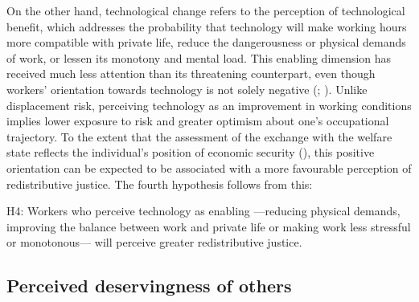 \documentclass[
  12pt,
]{article}
\begin{document}
On the other hand, technological change refers to the perception of
technological benefit, which addresses the probability that technology
will make working hours more compatible with private life, reduce the
dangerousness or physical demands of work, or lessen its monotony and
mental load. This enabling dimension has received much less attention
than its threatening counterpart, even though workers' orientation
towards technology is not solely negative
(;
). Unlike
displacement risk, perceiving technology as an improvement in working
conditions implies lower exposure to risk and greater optimism about
one's occupational trajectory. To the extent that the assessment of the
exchange with the welfare state reflects the individual's position of
economic security (), this
positive orientation can be expected to be associated with a more
favourable perception of redistributive justice. The fourth hypothesis
follows from this:

\begin{tcolorbox}[enhanced jigsaw, arc=.35mm, bottomrule=.15mm, breakable, colback=white, colframe=quarto-callout-color-frame, left=2mm, leftrule=.75mm, opacityback=0, rightrule=.15mm, toprule=.15mm]

H4: Workers who perceive technology as enabling ---reducing physical
demands, improving the balance between work and private life or making
work less stressful or monotonous--- will perceive greater
redistributive justice.

\end{tcolorbox}

\subsection{Perceived deservingness of
others}\label{perceived-deservingness-of-others}
\end{document}
